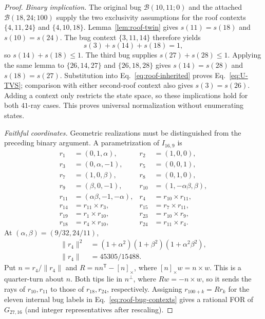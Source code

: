 \documentclass[aps,pra,reprint,superscriptaddress,longbibliography,nofootinbib,floatfix,10pt]{revtex4-2}
\theoremstyle{definition}\newtheorem{definition}[theorem]{Definition}
\theoremstyle{remark}\newtheorem{remark}[theorem]{Remark}
\begin{document}
\begin{proof}
\emph{Binary implication.} The original bug $\mathcal B(10,11;0)$ and the attached $\mathcal B(18,24;100)$ supply the two exclusivity assumptions for the roof contexts $\{4,11,24\}$ and $\{4,10,18\}$. Lemma~\ref{lem:roof-twin} gives $s(11)=s(18)$ and $s(10)=s(24)$. The bug context $\{3,11,14\}$ therefore yields
\begin{equation}\label{eq:roof-inherited}
s(3)+s(14)+s(18)=1,
\end{equation}
so $s(14)+s(18)\le1$. The third bug supplies $s(27)+s(28)\le1$. Applying the same lemma to $\{26,14,27\}$ and $\{26,18,28\}$ gives $s(14)=s(28)$ and $s(18)=s(27)$. Substitution into Eq.~\eqref{eq:roof-inherited} proves Eq.~\eqref{eq:U-TVS}; comparison with either second-roof context also gives $s(3)=s(26)$. Adding a context only restricts the state space, so these implications hold for both $41$-ray cases. This proves universal normalization without enumerating states.

\emph{Faithful coordinates.} Geometric realizations must be distinguished from the preceding binary argument. A parametrization of $I_{16,9}$ is
\begin{equation}\label{eq:roof-base-rays}
\begin{aligned}
r_1&=(0,1,\alpha),&r_2&=(1,0,0),\\
r_3&=(0,\alpha,-1),&r_5&=(0,0,1),\\
r_7&=(1,0,\beta),&r_8&=(0,1,0),\\
r_9&=(\beta,0,-1),&r_{10}&=(1,-\alpha\beta,\beta),\\
r_{11}&=(\alpha\beta,-1,-\alpha),&r_4&=r_{10}\times r_{11},\\
r_{14}&=r_{11}\times r_3,&r_{15}&=r_7\times r_{11},\\
r_{19}&=r_1\times r_{10},&r_{23}&=r_{10}\times r_9,\\
r_{18}&=r_4\times r_{10},&r_{24}&=r_{11}\times r_4.
\end{aligned}
\end{equation}
At $(\alpha,\beta)=(9/32,24/11)$,
\begin{equation}\label{eq:r4-norm-factorization}
\begin{aligned}
\|r_4\|^2&=(1+\alpha^2)(1+\beta^2)(1+\alpha^2\beta^2),\\
\|r_4\|&=45305/15488.
\end{aligned}
\end{equation}
Put $n=r_4/\|r_4\|$ and $R=nn^{\mathsf T}-[n]_\times$, where $[n]_\times w=n\times w$. This is a quarter-turn about $n$. Both tips lie in $n^\perp$, where $Rw=-n\times w$, so it sends the rays of $r_{10},r_{11}$ to those of $r_{18},r_{24}$, respectively. Assigning $r_{100+k}=Rr_k$ for the eleven internal bug labels in Eq.~\eqref{eq:roof-bug-contexts} gives a rational FOR of $G_{27,16}$ (and integer representatives after rescaling).


\end{proof}
\end{document}
